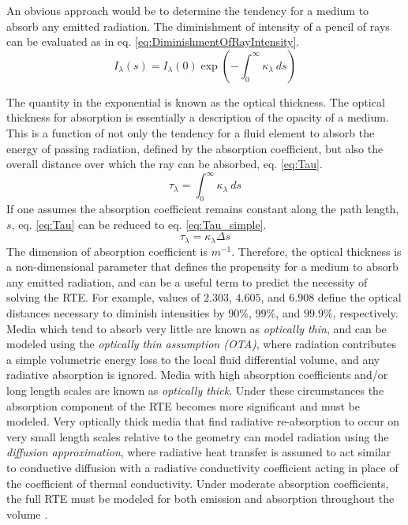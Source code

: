 An obvious approach would be to determine the tendency for a medium to absorb any emitted radiation. The diminishment of intensity of a pencil of rays can be evaluated as in eq. \ref{eq:DiminishmentOfRayIntensity}.
\begin{equation}
    I_\lambda{}(s)=I_\lambda{}(0)\exp{\left(-\int^\infty_0{\kappa{}_\lambda{}~ds}\right)}
    \label{eq:DiminishmentOfRayIntensity}
\end{equation}

The quantity in the exponential is known as the optical thickness. The optical thickness for absorption is essentially a description of the opacity of a medium. This is a function of not only the tendency for a fluid element to absorb the energy of passing radiation, defined by the absorption coefficient, but also the overall distance over which the ray can be absorbed, eq. \ref{eq:Tau}.
\begin{equation}
    \tau{}_\lambda = \int^\infty_0{\kappa{}_\lambda{}~ds}
    \label{eq:Tau}
\end{equation}
If one assumes the absorption coefficient remains constant along the path length, $s$, eq. \ref{eq:Tau} can be reduced to eq. \ref{eq:Tau_simple}.
\begin{equation}
    \tau{}_\lambda = \kappa{}_\lambda{}\Delta{s}
    \label{eq:Tau_simple}
\end{equation}
The dimension of absorption coefficient is $m^{-1}$. Therefore, the optical thickness is a non-dimensional parameter that defines the propensity for a medium to absorb any emitted radiation, and can be a useful term to predict the necessity of solving the RTE. 
For example, values of $2.303$, $4.605$, and $6.908$ define the optical distances necessary to diminish intensities by $90$\%, $99$\%, and $99.9$\%, respectively.
Media which tend to absorb very little are known as \textit{optically thin}, and can be modeled using the \textit{optically thin assumption (OTA)}, where radiation contributes a simple volumetric energy loss to the local fluid differential volume, and any radiative absorption is ignored.
Media with high absorption coefficients and/or long length scales are known as \textit{optically thick}. Under these circumstances the absorption component of the RTE becomes more significant and must be modeled.
Very optically thick media that find radiative re-absorption to occur on very small length scales relative to the geometry can model radiation using the \textit{diffusion approximation}, where radiative heat transfer is assumed to act similar to conductive diffusion with a radiative conductivity coefficient acting in place of the coefficient of thermal conductivity. 
Under moderate absorption coefficients, the full RTE must be modeled for both emission and absorption throughout the volume \cite{Modest2013RadiativeTransfer}.

